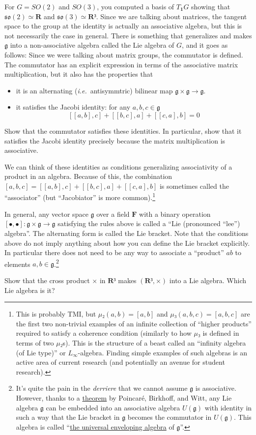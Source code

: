 For $G =SO(2)$ and $SO(3)$, you computed a basis of $T_𝟏G$ showing that $𝔰𝔬(2) ≃ 𝐑$ and $𝔰𝔬(3) ≃ 𝐑³$. Since we are talking about matrices, the tangent space to the group at the identity is actually an associative algebra, but this is not necessarily the case in general. There is something that generalizes and makes $𝔤$ into a non-associative algebra called the Lie algebra of $G$, and it goes as follows: 
Since we were talking about matrix groups, the commutator is defined. The commutator has an explicit expression in terms of the associative matrix multiplication, but it also has the properties that
\begin{itemize}
\item it is an alternating ({\it i.e.}\ antisymmtric) bilinear map $𝔤 × 𝔤 → 𝔤$. 
\item it satisfies the Jacobi identity: for any $a,b,c∈ 𝔤 $
$$
[[a,b],c] + [[b,c],a] + [[c,a],b] = 0
$$
\end{itemize}
\begin{exercise}
Show that the commutator satisfies these identities. In particular, show that it satisfies the Jacobi identity precisely because the matrix multiplication is associative. 
\end{exercise}
{We can think of these identities as conditions generalizing associativity of a product in an algebra. Because of this, the combination $[a,b,c]=[[a,b],c] + [[b,c],a] + [[c,a],b]$ is sometimes called the “associator” (but “Jacobiator” is more common).}\footnote{This is probably TMI, but $μ₂(a,b) = [a,b]$ and $μ₃(a,b,c)=[a,b,c]$ are the first two non-trivial examples of an infinite collection of “higher products” required to satisfy a coherence condition (similarly to how $μ₃$ is defined in terms of two $μ₂$s). This is the structure of a beast called an “infinity algebra (of Lie type)” or $L_∞$-algebra. Finding simple examples of such algebras is an active area of current research (and potentially an avenue for student research).}


In general, any vector space $𝔤$ over a field $𝐅$ with a binary operation $[∙ , ∙ ] : 𝔤 × 𝔤 → 𝔤$ satisfying the rules above is called a “Lie (pronounced “lee”) algebra”. The alternating form is called the Lie bracket. Note that the conditions above do not imply anything about how you can define the Lie bracket explicitly. In particular there does not need to be any way to associate a “product” $ab$ to elements $a,b∈ 𝔤$.\footnote{It's quite the pain in the {\it derriere} that we cannot assume $𝔤$ is associative. However, thanks to a \href{https://en.wikipedia.org/wiki/Poincaré–Birkhoff–Witt_theorem}{theorem} by Poincaré, Birkhoff, and Witt, any Lie algebra $𝔤$ can be embedded into an associative algebra $U(𝔤)$ with identity in such a way that the Lie bracket in $𝔤$ becomes the commutator in $U(𝔤)$. This algebra is called “\href{https://en.wikipedia.org/wiki/Universal_enveloping_algebra}{the universal enveloping algebra} of $𝔤$”.
} 
\begin{exercise}
Show that the cross product $×$ in $𝐑³$ makes $(𝐑³, × )$ into a Lie algebra. Which Lie algebra is it?
\end{exercise}



